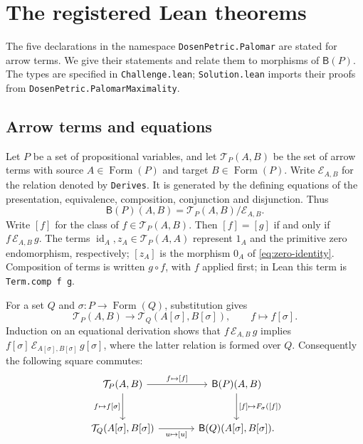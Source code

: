 \documentclass[11pt]{article}
\newcommand{\B}{\mathsf B}
\newcommand{\FormulaSet}{\operatorname{Form}}
\begin{document}
\section{The registered Lean theorems}\label{app:lean-statements}

The five declarations in the namespace \texttt{DosenPetric.Palomar}
are stated for arrow terms. We give their statements and relate them
to morphisms of $\B(P)$. The types are specified in \texttt{Challenge.lean};
\texttt{Solution.lean} imports their proofs from
\texttt{DosenPetric.PalomarMaximality}.

\subsection{Arrow terms and equations}\label{app:terms-equations}

Let $P$ be a set of propositional variables, and let
$\mathcal T_P(A,B)$ be the set of arrow terms with source
$A\in\FormulaSet(P)$ and target $B\in\FormulaSet(P)$.
Write $\mathcal E_{A,B}$ for the relation denoted by
\texttt{Derives}. It is generated by the defining equations of
the presentation, equivalence, composition, conjunction and
disjunction. Thus
\[
 \B(P)(A,B)=\mathcal T_P(A,B)/\mathcal E_{A,B}.
\]
Write $[f]$ for the class of $f\in\mathcal T_P(A,B)$.
Then $[f]=[g]$ if and only if $f\,\mathcal E_{A,B}\,g$.
The terms $\operatorname{id}_A,z_A\in\mathcal T_P(A,A)$ represent
$1_A$ and the primitive zero endomorphism, respectively; $[z_A]$ is
the morphism $0_A$ of
\eqref{eq:zero-identity}. Composition of terms is written $g\circ f$,
with $f$ applied first; in Lean this term is \texttt{Term.comp f g}.

For a set $Q$ and $\sigma:P\to\FormulaSet(Q)$, substitution gives
\[
 \mathcal T_P(A,B)\longrightarrow
 \mathcal T_Q(A[\sigma],B[\sigma]),\qquad f\longmapsto f[\sigma].
\]
Induction on an equational derivation shows that
$f\,\mathcal E_{A,B}\,g$ implies
$f[\sigma]\,\mathcal E_{A[\sigma],B[\sigma]}\,g[\sigma]$,
where the latter relation is formed over $Q$.
Consequently the following square commutes:
\[
\begin{tikzcd}[column sep=large,row sep=large]
 \mathcal T_P(A,B)\arrow[r,"{f\mapsto[f]}"]
   \arrow[d,"{f\mapsto f[\sigma]}"']
   &\B(P)(A,B)\arrow[d,"{[f]\mapsto F_\sigma([f])}"]\\
 \mathcal T_Q(A[\sigma],B[\sigma])
   \arrow[r,"{u\mapsto[u]}"']
   &\B(Q)(A[\sigma],B[\sigma]).
\end{tikzcd}
\]
\end{document}
